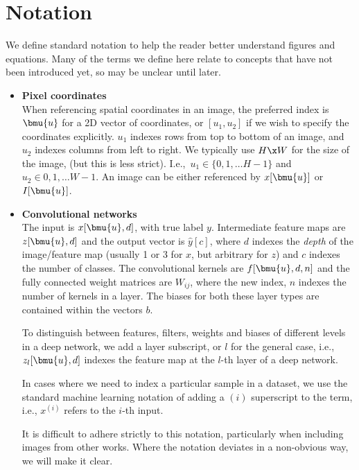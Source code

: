 \section{Notation}
We define standard notation to help the reader better understand figures and
equations. Many of the terms we define here relate to concepts that have not been
introduced yet, so may be unclear until later.

\begin{itemize}
  \item \textbf{Pixel coordinates}\\
    When referencing spatial coordinates in an image, the preferred index
    is $\bmu{u}$ for a 2D vector of coordinates, or $[u_1,u_2]$ if we wish to
    specify the coordinates explicitly. $u_1$ indexes rows from top to bottom
    of an image, and $u_2$ indexes columns from left to right. We typically use
    $H\x W$ for the size of the image, (but this is less strict). I.e.,\ 
    $u_1 \in \{0, 1, \ldots H-1\}$ and $u_2 \in {0, 1, \ldots W-1}$. An image
    can be either referenced by $x[\bmu{u}]$ or $I[\bmu{u}]$.

  \item \textbf{Convolutional networks}\\
    The input is $x[\bmu{u}, d]$, with true label $y$. Intermediate
    feature maps are $z[\bmu{u}, d]$ and the output vector is $\hat{y}[c]$, where $d$
    indexes the \emph{depth} of the image/feature map (usually 1 or 3 for $x$,
    but arbitrary for $z$) and $c$ indexes the number of classes. The
    convolutional kernels are $f[\bmu{u}, d, n]$ and the fully connected weight
    matrices are $W_{ij}$, where the new index, $n$ indexes the number of
    kernels in a layer. The biases for both these layer types are contained
    within the vectors $b$. 
    
    To distinguish between features, filters, weights and biases of different
    levels in a deep network, we add a layer subscript, or $l$ for the
    general case, i.e.,\ $z_l[\bmu{u}, d]$ indexes the feature map at the $l$-th
    layer of a deep network. 
    
    In cases where we need to index a particular sample in a dataset, we use
    the standard machine learning notation of adding a $(i)$ superscript to
    the term, i.e., $x^{(i)}$ refers to the $i$-th input. 

    It is difficult to adhere strictly to this notation, particularly when
    including images from other works. Where the notation deviates in
    a non-obvious way, we will make it clear.


\end{itemize}
